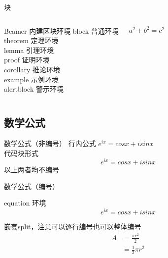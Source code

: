\documentclass[UTF8,14pt,aspectratio=43,dvipsnames,svgnames,x11names,hyperref={urlcolor=blue}]{beamer}
\begin{document}
\begin{frame}{块}
	\begin{columns}
			\begin{block}{Beamer 内建区块环境}
				block 普通环境\\
				theorem 定理环境\\
				lemma 引理环境\\
				proof 证明环境\\
				corollary 推论环境\\
				example 示例环境\\
				alertblock 警示环境
			\end{block}
		
			\begin{theorem}[勾股定理]
				\begin{equation}  
					a^2+b^2=c^2
				\end{equation}
			\end{theorem}
	\end{columns}
\end{frame}

\subsection{数学公式}

\begin{frame}{数学公式（非编号）}
	行内公式 $e^{ix}=cosx+isinx$\\
	代码块形式
	$$e^{ix}=cosx+isinx$$
	以上两者均不编号
\end{frame}

\begin{frame}{数学公式（编号）}
	\begin{block}{equation 环境}
		\begin{equation} \label{euler eqn}
			e^{ix}=cosx+isinx
		\end{equation}
	\end{block}
	\begin{block}{嵌套split，注意可以逐行编号也可以整体编号}
		\begin{equation}
			\begin{split}
				A & = \frac{\pi r^2}{2} \\
				& = \frac{1}{2} \pi r^2
			\end{split}
		\end{equation}
	\end{block}
\end{frame}
\end{document}
